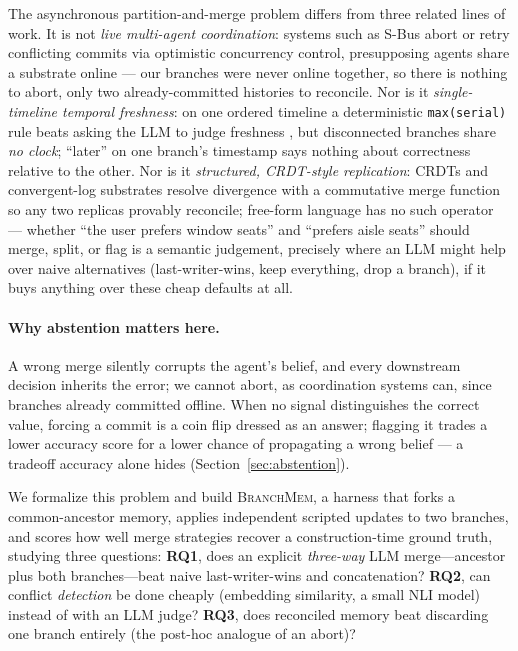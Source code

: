 \documentclass[11pt]{article}
\begin{document}
The asynchronous partition-and-merge problem differs from three related
lines of work. It is not \emph{live multi-agent coordination}: systems such
as S-Bus \citep{khan2026sbus} abort or retry conflicting commits via
optimistic concurrency control, presupposing agents share a substrate
online --- our branches were never online together, so there is nothing to
abort, only two already-committed histories to reconcile. Nor is it
\emph{single-timeline temporal freshness}: on one ordered timeline a
deterministic \texttt{max(serial)} rule beats asking the LLM to judge
freshness \citep{reddy2026freshness}, but disconnected branches share
\emph{no clock}; ``later'' on one branch's timestamp says nothing about
correctness relative to the other. Nor is it \emph{structured, CRDT-style
replication}: CRDTs \citep{shapiro2011crdt} and convergent-log substrates
\citep{sarkar2026grite} resolve divergence with a commutative merge
function so any two replicas provably reconcile; free-form language has no
such operator --- whether ``the user prefers window seats'' and ``prefers
aisle seats'' should merge, split, or flag is a semantic judgement,
precisely where an LLM might help over naive alternatives
(last-writer-wins, keep everything, drop a branch), if it buys anything
over these cheap defaults at all.

\paragraph{Why abstention matters here.} A wrong merge silently corrupts
the agent's belief, and every downstream decision inherits the error; we
cannot abort, as coordination systems can, since branches already
committed offline. When no signal distinguishes the correct value, forcing
a commit is a coin flip dressed as an answer; flagging it trades a lower
accuracy score for a lower chance of propagating a wrong belief --- a
tradeoff accuracy alone hides (Section~\ref{sec:abstention}).

We formalize this problem and build \textsc{BranchMem}, a harness that
forks a common-ancestor memory, applies independent scripted updates to two
branches, and scores how well merge strategies recover a construction-time
ground truth, studying three questions: \textbf{RQ1}, does an explicit
\emph{three-way} LLM merge---ancestor plus both branches---beat naive
last-writer-wins and concatenation? \textbf{RQ2}, can conflict
\emph{detection} be done cheaply (embedding similarity, a small NLI model)
instead of with an LLM judge? \textbf{RQ3}, does reconciled memory beat
discarding one branch entirely (the post-hoc analogue of an abort)?
\end{document}
